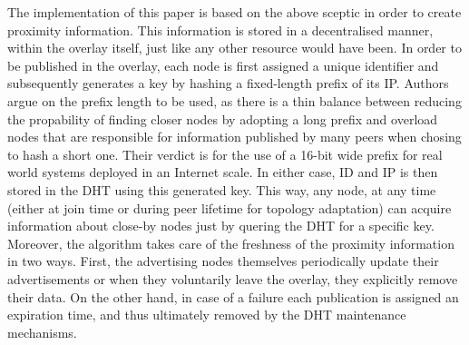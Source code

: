 \documentclass[a4paper,10pt]{article}
\begin{document}
The implementation of this paper is based on the above sceptic in order to create proximity information. This information is stored in a decentralised manner, within the overlay itself, just like any other resource would have been. In order to be published in the overlay, each node is first assigned a unique identifier and subsequently generates a key by hashing a fixed-length prefix of its IP. Authors argue on the prefix length to be used, as there is a thin balance between reducing the propability of finding closer nodes by adopting a long prefix and overload nodes that are responsible for information published by many peers when chosing to hash a short one. Their verdict is for the use of a 16-bit wide prefix for real world systems deployed in an Internet scale. In either case, ID and IP is then stored in the DHT using this generated key. This way, any node, at any time (either at join time or during peer lifetime for topology adaptation) can acquire information about close-by nodes just by quering the DHT for a specific key. Moreover, the algorithm takes care of the freshness of the proximity information in two ways. First, the advertising nodes themselves periodically update their advertisements or when they voluntarily leave the overlay, they explicitly remove their data. On the other hand, in case of a failure each publication is assigned an expiration time, and thus ultimately removed by the DHT maintenance mechanisms.
\end{document}
